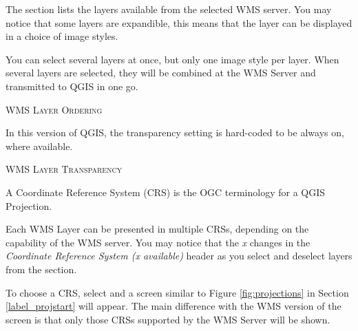 
The  section lists the layers available from the selected
WMS server.  You may notice that some layers are expandible, this means
that the layer can be displayed in a choice of image styles.

You can select several layers at once, but only one image style per layer.
When several layers are selected, they will be combined at the WMS Server
and transmitted to QGIS in one go.

\begin{Tip}[ht]\caption{\textsc{WMS Layer Ordering}}
\end{Tip}

\label{ogc-wms-transparency}

In this version of QGIS, the transparency setting is hard-coded to 
be always on, where available.

\begin{Tip}[ht]\caption{\textsc{WMS Layer Transparency}}
\end{Tip}


A Coordinate Reference System (CRS) is the OGC terminology for a QGIS Projection.

Each WMS Layer can be presented in multiple CRSs, depending
on the capability of the WMS server.  You may notice that the \textsl{x} changes in
the \textsl{Coordinate Reference System (x available)} header as you
select and deselect layers from the  section.

To choose a CRS, select  and a screen similar to
Figure \ref{fig:projections} in Section \ref{label_projstart} will appear.
The main difference with the WMS version of the screen is that only
those CRSs supported by the WMS Server will be shown.



